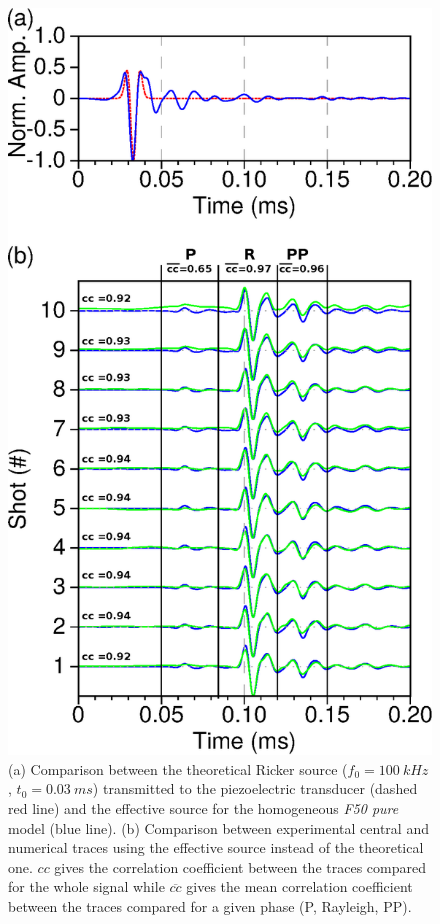 \documentclass[extra,mreferee]{gji}
\begin{document}
\clearpage
\newpage

\begin{figure}
\centering
\includegraphics[width=0.50\columnwidth]{Fig/Fig10.eps}
\caption{(a) Comparison between the theoretical Ricker source ($f_{0}=100\ kHz$, $t_{0}=0.03\ ms$) transmitted to the piezoelectric transducer (dashed red line) and the effective source for the homogeneous \textit{F50 pure} model (blue line). (b) Comparison between experimental central and numerical traces using the effective source instead of the theoretical one. $cc$ gives the correlation coefficient between the traces compared for the whole signal while $\overline{cc}$ gives the mean correlation coefficient between the traces compared for a given phase (P, Rayleigh, PP).}
\label{Fig:Fig10}
\end{figure}

\clearpage
\newpage
\end{document}
